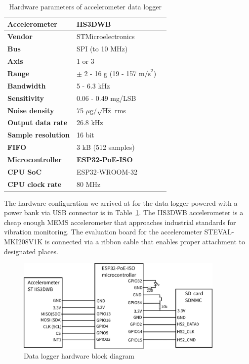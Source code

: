 \begin{table}[h]
\renewcommand{\arraystretch}{1.2}
\centering
\begin{tabular}{|l|l|l|}
\hline
\textbf{Accelerometer}                   & \textbf{IIS3DWB}   \\ \hline
\textbf{Vendor}                          & STMicroelectronics \\ \hline
\textbf{Bus}                             & SPI  (to 10 MHz)               \\ \hline
\textbf{Axis}                            & 1 or 3             \\ \hline
\textbf{Range}                           & $\pm$ 2 - 16 g (19 - 157 $\mathrm{m/s}^2$)   \\ \hline
\textbf{Bandwidth}                       & 5 - 6.3 kHz           \\ \hline
\textbf{Sensitivity}                     & 0.06 - 0.49 mg/LSB      \\ \hline
\textbf{Noise density} & 75 $\mu \mathrm{g} / \sqrt{\mathrm{Hz}}$ rms                \\ \hline
\textbf{Output data rate}               & 26.8 kHz             \\ \hline
\textbf{Sample resolution}              & 16 bit                 \\ \hline
\textbf{FIFO}                           & 3 kB (512 samples) \\ \hline
\textbf{Microcontroller}                & \textbf{ESP32-PoE-ISO}      \\ \hline
\textbf{CPU SoC}                                 & ESP32-WROOM-32     \\ \hline
\textbf{CPU clock rate}                          & 80 MHz     \\ \hline
\end{tabular}
\caption{Hardware parameters of accelerometer data logger}
\label{tab:design:hw-sensors}
\end{table}

The hardware configuration we arrived at for the data logger powered with a power bank via USB connector is in Table~\ref{tab:design:hw-sensors}. The IIS3DWB accelerometer is a cheap enough MEMS accelerometer that approaches industrial standards for vibration monitoring. The evaluation board for the accelerometer STEVAL-MKI208V1K is connected via a ribbon cable that enables proper attachment to designated places.

\begin{figure}[h]
	\centering
	\includegraphics[width=0.9\textwidth]{assets/design/hw-block-schematic.png}
	\caption{Data logger hardware block diagram}
	\label{fig:design:block-diagram-hw}
\end{figure} 

